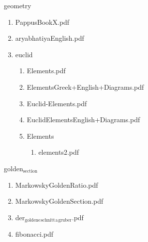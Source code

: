 \documentclass[11pt]{article}
\begin{document}
\item geometry
\label{sec-1-1-1-1-29-32}
\begin{enumerate}
\item PappusBookX.pdf
\label{sec-1-1-1-1-29-32-1}

\item aryabhatiyaEnglish.pdf
\label{sec-1-1-1-1-29-32-2}

\item euclid
\label{sec-1-1-1-1-29-32-3}
\begin{enumerate}
\item Elements.pdf
\label{sec-1-1-1-1-29-32-3-1}

\item ElementsGreek+English+Diagrams.pdf
\label{sec-1-1-1-1-29-32-3-2}

\item Euclid-Elements.pdf
\label{sec-1-1-1-1-29-32-3-3}

\item EuclidElementsEnglish+Diagrams.pdf
\label{sec-1-1-1-1-29-32-3-4}

\item Elements
\label{sec-1-1-1-1-29-32-3-5}
\begin{enumerate}
\item elements2.pdf
\label{sec-1-1-1-1-29-32-3-5-1}
\end{enumerate}
\end{enumerate}
\end{enumerate}

\item golden$_{\text{section}}$
\label{sec-1-1-1-1-29-33}
\begin{enumerate}
\item MarkowskyGoldenRatio.pdf
\label{sec-1-1-1-1-29-33-1}

\item MarkowskyGoldenSection.pdf
\label{sec-1-1-1-1-29-33-2}

\item der$_{\text{goldene}}$$_{\text{schnitt}}$$_{\text{a}}$$_{\text{gruber}}$.pdf
\label{sec-1-1-1-1-29-33-3}

\item fibonacci.pdf
\label{sec-1-1-1-1-29-33-4}
\end{enumerate}
\end{document}
